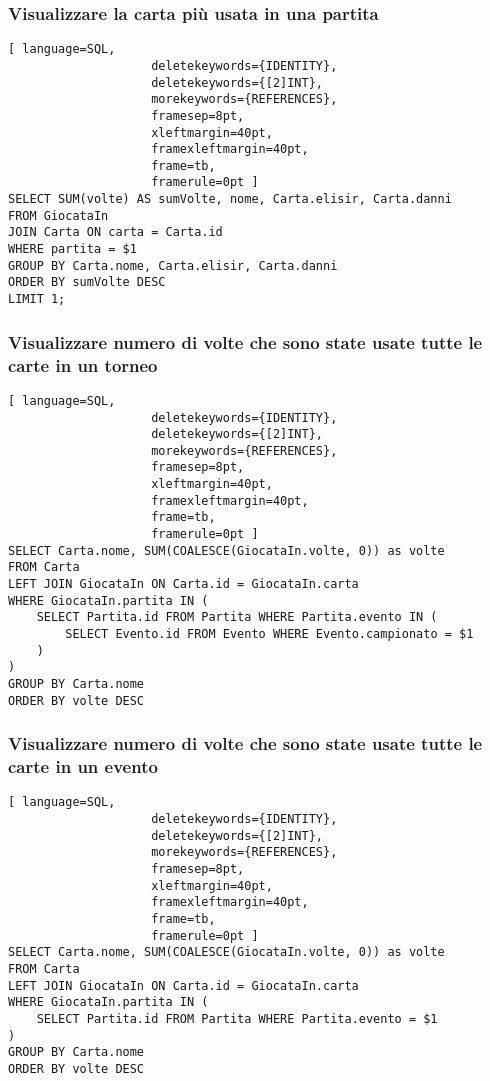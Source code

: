 \documentclass{article}
\begin{document}
\subsubsection{Visualizzare la carta più usata in una partita}
\begin{lstlisting}[ language=SQL,
                    deletekeywords={IDENTITY},
                    deletekeywords={[2]INT},
                    morekeywords={REFERENCES},
                    framesep=8pt,
                    xleftmargin=40pt,
                    framexleftmargin=40pt,
                    frame=tb,
                    framerule=0pt ]
SELECT SUM(volte) AS sumVolte, nome, Carta.elisir, Carta.danni
FROM GiocataIn
JOIN Carta ON carta = Carta.id
WHERE partita = $1
GROUP BY Carta.nome, Carta.elisir, Carta.danni
ORDER BY sumVolte DESC
LIMIT 1;
\end{lstlisting}

\subsubsection{Visualizzare numero di volte che sono state usate tutte le carte in un torneo}
\begin{lstlisting}[ language=SQL,
                    deletekeywords={IDENTITY},
                    deletekeywords={[2]INT},
                    morekeywords={REFERENCES},
                    framesep=8pt,
                    xleftmargin=40pt,
                    framexleftmargin=40pt,
                    frame=tb,
                    framerule=0pt ]
SELECT Carta.nome, SUM(COALESCE(GiocataIn.volte, 0)) as volte
FROM Carta
LEFT JOIN GiocataIn ON Carta.id = GiocataIn.carta 
WHERE GiocataIn.partita IN (
    SELECT Partita.id FROM Partita WHERE Partita.evento IN (
        SELECT Evento.id FROM Evento WHERE Evento.campionato = $1
    )
)
GROUP BY Carta.nome
ORDER BY volte DESC
\end{lstlisting}

\subsubsection{Visualizzare numero di volte che sono state usate tutte le carte in un evento}
\begin{lstlisting}[ language=SQL,
                    deletekeywords={IDENTITY},
                    deletekeywords={[2]INT},
                    morekeywords={REFERENCES},
                    framesep=8pt,
                    xleftmargin=40pt,
                    framexleftmargin=40pt,
                    frame=tb,
                    framerule=0pt ]
SELECT Carta.nome, SUM(COALESCE(GiocataIn.volte, 0)) as volte
FROM Carta
LEFT JOIN GiocataIn ON Carta.id = GiocataIn.carta 
WHERE GiocataIn.partita IN (
    SELECT Partita.id FROM Partita WHERE Partita.evento = $1
)
GROUP BY Carta.nome
ORDER BY volte DESC
\end{lstlisting}
\end{document}
